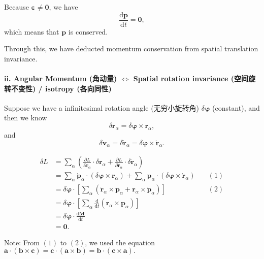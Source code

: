 Because \(\boldsymbol{\varepsilon} \neq \boldsymbol{0}\), we have
\[\frac{\mathrm{d} \boldsymbol{p}}{\mathrm{d}t} = \boldsymbol{0},\]which
means that \(\boldsymbol{p}\) is conserved.

Through this, we have deducted momentum conservation from spatial
translation invariance.

\paragraph{ii. Angular Momentum (角动量)
\(\Leftrightarrow\) Spatial rotation invariance (空间旋转不变性) /
isotropy
(各向同性)}\label{angular-momentum-ux89d2ux52a8ux91cf-leftrightarrow-spatial-rotation-invariance-ux7a7aux95f4ux65cbux8f6cux4e0dux53d8ux6027-isotropy-ux5404ux5411ux540cux6027}

Suppose we have a infinitesimal rotation angle (无穷小旋转角)
\(\delta \boldsymbol{\varphi}\) (constant), and then we know
\[\delta \boldsymbol{r}_\alpha = \delta \boldsymbol{\varphi} \times \boldsymbol{r}_\alpha,\]
and
\[\delta \boldsymbol{v}_\alpha = \delta \dot{\boldsymbol{r}}_\alpha = \delta \boldsymbol{\varphi} \times \dot{\boldsymbol{r}}_\alpha.\]

\begin{align*}
    \delta L & = \sum_{\alpha} \left( \frac{\partial L}{\partial \boldsymbol{r}_\alpha} \cdot \delta \boldsymbol{r}_\alpha + \frac{\partial L}{\partial \dot{\boldsymbol{r}}_\alpha} \cdot \delta \dot{\boldsymbol{r}}_\alpha \right) \\
    & = \sum_{\alpha} \dot{\boldsymbol{p}}_\alpha \cdot \left( \delta \boldsymbol{\varphi} \times \boldsymbol{r}_\alpha \right) + \sum_{\alpha} \boldsymbol{p}_\alpha \cdot \left( \delta \boldsymbol{\varphi} \times \dot{\boldsymbol{r}}_\alpha \right) & \quad (1)\\
    & = \delta \boldsymbol{\varphi} \cdot \left[ \sum_{\alpha} \left( \dot{\boldsymbol{r}}_\alpha \times \boldsymbol{p}_\alpha + \boldsymbol{r}_\alpha \times \dot{\boldsymbol{p}}_\alpha \right) \right] & \quad (2)\\
    & = \delta \boldsymbol{\varphi} \cdot \left[ \sum_{\alpha} \frac{\mathrm{d}}{\mathrm{d}t} (\boldsymbol{r}_\alpha \times \boldsymbol{p}_\alpha) \right] \\
    & = \delta \boldsymbol{\varphi} \cdot \frac{\mathrm{d} \boldsymbol{M}}{\mathrm{d}t} \\
    & = \boldsymbol{0}.
\end{align*}

Note: From \((1)\) to \((2)\), we used the equation
\(\boldsymbol a \cdot (\boldsymbol b \times \boldsymbol c) = \boldsymbol c \cdot (\boldsymbol a \times \boldsymbol b) = \boldsymbol b \cdot (\boldsymbol c \times \boldsymbol a).\)

